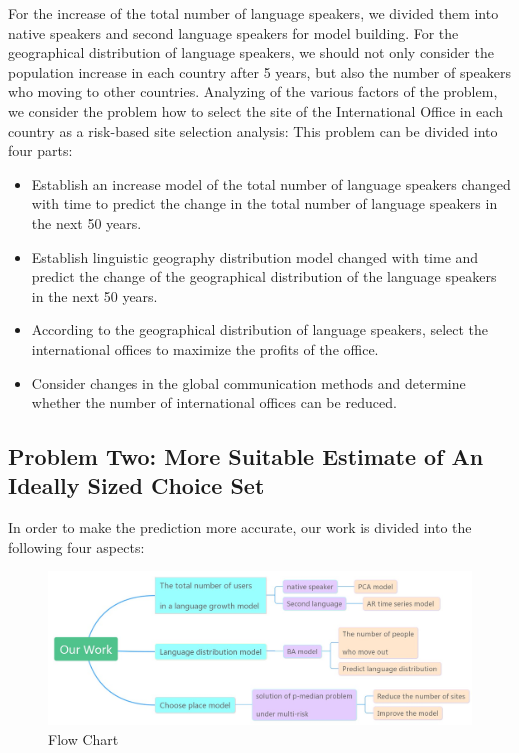     For the increase of the total number of language speakers, we divided them into native speakers and second language speakers for model building. For the geographical distribution of language speakers, we should not only consider the population increase in each country after 5 years, but also the number of speakers who moving to other countries. Analyzing of the various factors of the problem, we consider the problem how to select the site of the International Office in each country as a risk-based site selection analysis:
This problem can be divided into four parts:
    \begin{itemize}         %
      \item Establish an increase model of the total number of language speakers changed with time to predict the change in the total number of language speakers in the next 50 years.
      \item Establish linguistic geography distribution model changed with time and predict the change of the geographical distribution of the language speakers in the next 50 years.
      \item According to the geographical distribution of language speakers, select the international offices to maximize the profits of the office.
      \item Consider changes in the global communication methods and determine whether the number of international offices can be reduced.
    \end{itemize}

\subsection{Problem Two:  More Suitable Estimate of An Ideally Sized Choice Set}                 
    In order to make the prediction more accurate, our work is divided into the following four aspects:
        \begin{figure}[!htbp]                                       
        \centering
        \includegraphics[width = .8\textwidth]{ourwork.jpg}      
        \caption{Flow Chart}                          
        \label{ourwork}                                      
    \end{figure}
